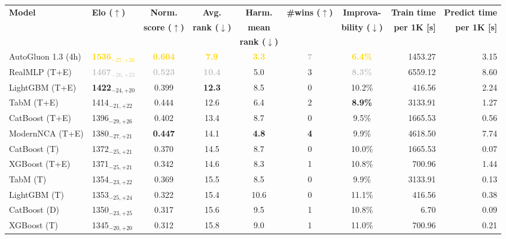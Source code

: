 \begin{tabular}{llcccccrr}
\toprule
\textbf{Model} & \textbf{Elo ($\uparrow$)} & \textbf{Norm.} & \textbf{Avg.} & \textbf{Harm.} & \textbf{\#wins ($\uparrow$)} & \textbf{Improva-} & \textbf{Train time} & \textbf{Predict time} \\
 &  & \textbf{score ($\uparrow$)} & \textbf{rank ($\downarrow$)} & \textbf{mean} &  & \textbf{bility ($\downarrow$)} & \textbf{per 1K [s]} & \textbf{per 1K [s]} \\
 &  &  &  & \textbf{rank ($\downarrow$)} &  &  &  &  \\
\midrule
AutoGluon 1.3 (4h) & \textcolor{gold}{\textbf{1536${}_{-27,+26}$}} & \textcolor{gold}{\textbf{0.604}} & \textcolor{gold}{\textbf{7.9}} & \textcolor{gold}{\textbf{3.3}} & \textcolor{silver}{\textbf{7}} & \textcolor{gold}{\textbf{6.4\%}} & 1453.27 & 3.15 \\
RealMLP (T+E) & \textcolor{silver}{\textbf{1467${}_{-26,+23}$}} & \textcolor{silver}{\textbf{0.523}} & \textcolor{silver}{\textbf{10.4}} & 5.0 & 3 & \textcolor{silver}{\textbf{8.3\%}} & 6559.12 & 8.60 \\
LightGBM (T+E) & \textcolor{bronze}{\textbf{1422${}_{-24,+20}$}} & 0.399 & \textcolor{bronze}{\textbf{12.3}} & 8.5 & 0 & 10.2\% & 416.56 & 2.24 \\
TabM (T+E) & 1414${}_{-21,+22}$ & 0.444 & 12.6 & 6.4 & 2 & \textcolor{bronze}{\textbf{8.9\%}} & 3133.91 & 1.27 \\
CatBoost (T+E) & 1396${}_{-29,+26}$ & 0.402 & 13.4 & 8.7 & 0 & 9.5\% & 1665.53 & 0.56 \\
ModernNCA (T+E) & 1380${}_{-27,+21}$ & \textcolor{bronze}{\textbf{0.447}} & 14.1 & \textcolor{bronze}{\textbf{4.8}} & \textcolor{bronze}{\textbf{4}} & 9.9\% & 4618.50 & 7.74 \\
CatBoost (T) & 1372${}_{-25,+21}$ & 0.370 & 14.5 & 8.7 & 0 & 10.0\% & 1665.53 & 0.07 \\
XGBoost (T+E) & 1371${}_{-25,+21}$ & 0.342 & 14.6 & 8.3 & 1 & 10.8\% & 700.96 & 1.44 \\
TabM (T) & 1354${}_{-23,+22}$ & 0.369 & 15.5 & 8.5 & 0 & 9.9\% & 3133.91 & 0.13 \\
LightGBM (T) & 1353${}_{-25,+24}$ & 0.322 & 15.4 & 10.6 & 0 & 11.1\% & 416.56 & 0.38 \\
CatBoost (D) & 1350${}_{-23,+25}$ & 0.317 & 15.6 & 9.5 & 1 & 10.8\% & 6.70 & 0.09 \\
XGBoost (T) & 1345${}_{-20,+20}$ & 0.312 & 15.8 & 9.0 & 1 & 11.0\% & 700.96 & 0.21 \\

\end{tabular}
